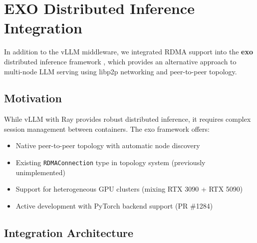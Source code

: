 \documentclass[10pt,letterpaper]{article}
\begin{document}
\section{EXO Distributed Inference Integration}

In addition to the vLLM middleware, we integrated RDMA support into the \textbf{exo} distributed inference framework \cite{exo-github}, which provides an alternative approach to multi-node LLM serving using libp2p networking and peer-to-peer topology.

\subsection{Motivation}

While vLLM with Ray provides robust distributed inference, it requires complex session management between containers. The exo framework offers:

\begin{itemize}[noitemsep]
    \item Native peer-to-peer topology with automatic node discovery
    \item Existing \texttt{RDMAConnection} type in topology system (previously unimplemented)
    \item Support for heterogeneous GPU clusters (mixing RTX 3090 + RTX 5090)
    \item Active development with PyTorch backend support (PR \#1284)
\end{itemize}

\subsection{Integration Architecture}
\end{document}
